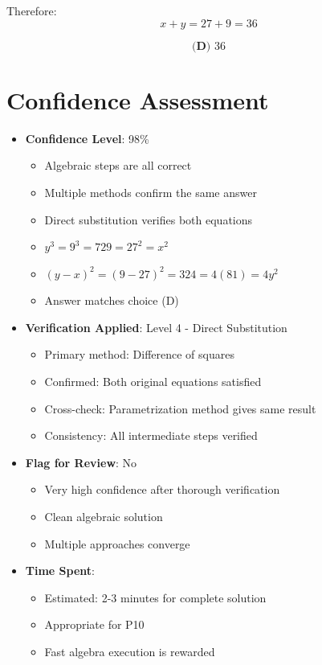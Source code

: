 \documentclass[12pt]{article}
\begin{document}
Therefore:
$$x + y = 27 + 9 = 36$$

$$\boxed{\textbf{(D) } 36}$$

\section*{Confidence Assessment}
\begin{itemize}[leftmargin=*]
    \item \textbf{Confidence Level}: 98\% 
    \begin{itemize}
        \item Algebraic steps are all correct
        \item Multiple methods confirm the same answer
        \item Direct substitution verifies both equations
        \item $y^3 = 9^3 = 729 = 27^2 = x^2$ \checkmark
        \item $(y-x)^2 = (9-27)^2 = 324 = 4(81) = 4y^2$ \checkmark
        \item Answer matches choice (D)
    \end{itemize}
    \item \textbf{Verification Applied}: Level 4 - Direct Substitution
    \begin{itemize}
        \item Primary method: Difference of squares
        \item Confirmed: Both original equations satisfied
        \item Cross-check: Parametrization method gives same result
        \item Consistency: All intermediate steps verified
    \end{itemize}
    \item \textbf{Flag for Review}: No
    \begin{itemize}
        \item Very high confidence after thorough verification
        \item Clean algebraic solution
        \item Multiple approaches converge
    \end{itemize}
    \item \textbf{Time Spent}: 
    \begin{itemize}
        \item Estimated: 2-3 minutes for complete solution
        \item Appropriate for P10
        \item Fast algebra execution is rewarded
    \end{itemize}
\end{itemize}
\end{document}
